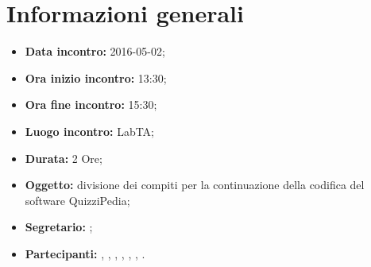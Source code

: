 \newpage
\section{Informazioni generali}
\begin{itemize}
\item \textbf{Data incontro:} 2016-05-02;
\item \textbf{Ora inizio incontro:} 13:30;
\item \textbf{Ora fine incontro:} 15:30;
\item \textbf{Luogo incontro:} LabTA;
\item \textbf{Durata:} 2 Ore;
\item \textbf{Oggetto:} divisione dei compiti per la continuazione della codifica del software QuizziPedia;
\item \textbf{Segretario:} \SM;
\item \textbf{Partecipanti:} \AF, \FB, \GN, \GR, \MV, \MP, \SM.
\end{itemize}
